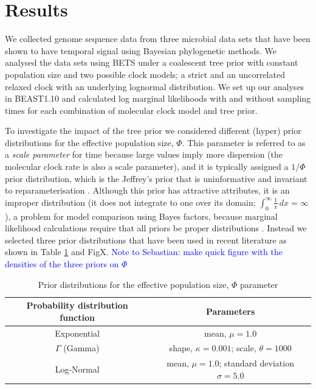 \documentclass[10pt,letterpaper]{article}
\begin{document}
\section*{Results}
We collected genome sequence data from three microbial data sets that have been shown to have temporal signal using Bayesian phylogenetic methods. We analysed the data sets using BETS under a coalescent tree prior with constant population size and two possible clock models; a strict and an uncorrelated relaxed clock with an underlying lognormal distribution. We set up our analyses in BEAST1.10 \cite{suchard2018bayesian} and calculated log marginal likelihoods with and without sampling times for each combination of molecular clock model and tree prior. 

To investigate the impact of the tree prior we considered different (hyper) prior distributions for the effective population size, $\Phi$. This parameter is referred to as a \textit{scale parameter} for time because large values imply more dispersion (the molecular clock rate is also a scale parameter), and it is typically assigned a $1/\Phi$ prior distribution, which is the Jeffrey's prior that is uninformative and invariant to reparameterisation  \cite{drummond2002estimating}. Although this prior has attractive attributes, it is an improper distribution (it does not integrate to one over its domain; $\int_{0}^{\infty} \frac{1}{x}\,dx=\infty$), a problem for model comparison using Bayes factors, because marginal likelihood calculations require that all priors be proper distributions \cite{r2019marginal, baele2013proper}. Instead we selected three prior distributions that have been used in recent literature as shown in Table \ref{table:prior_distros_on_Phi} and FigX. \textcolor{blue}{Note to Sebastian: make quick figure with the densities of the three priors on $\Phi$}

\begin{table}
\caption{Prior distributions for the effective population size, $\Phi$ parameter}
\begin{center} 
	\label{table:prior_distros_on_Phi}
	\begin{tabular}{c|c}
		Probability distribution function & Parameters\\
		\hline
		Exponential & mean, $\mu=1.0$\\
        $\Gamma$ (Gamma) & shape, $\kappa=0.001$; scale, $\theta=1000$\\
		Log-Normal & mean, $\mu=1.0$; standard deviation $\sigma=5.0$\\
	\end{tabular}
\end{center}
\end{table}
\end{document}
